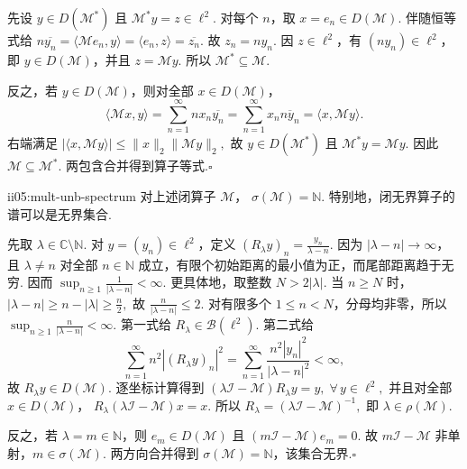 \begin{FAProof}
先设 \(\displaystyle y\in D(\mathcal M^*)\) 且 \(\displaystyle\mathcal M^*y=z\in\ell^2\). 对每个 \(\displaystyle n\)，取 \(\displaystyle x=e_n\in D(\mathcal M)\). 伴随恒等式给
\(\displaystyle n\overline{y_n} = \langle\mathcal Me_n,y\rangle = \langle e_n,z\rangle = \overline{z_n}.\)
故 \(\displaystyle z_n=ny_n\). 因 \(\displaystyle z\in\ell^2\)，有 \(\displaystyle(ny_n)\in\ell^2\)，即 \(\displaystyle y\in D(\mathcal M)\)，并且 \(\displaystyle z=\mathcal My\). 所以 \(\displaystyle\mathcal M^*\subseteq\mathcal M\).

反之，若 \(\displaystyle y\in D(\mathcal M)\)，则对全部 \(\displaystyle x\in D(\mathcal M)\)，
\[
\langle\mathcal Mx,y\rangle
=
\sum_{n=1}^{\infty}nx_n\overline{y_n}
=
\sum_{n=1}^{\infty}x_n\overline{ny_n}
=
\langle x,\mathcal My\rangle.
\]
右端满足
\(\displaystyle |\langle x,\mathcal My\rangle| \leqslant \|x\|_2\|\mathcal My\|_2,\)
故 \(\displaystyle y\in D(\mathcal M^*)\) 且 \(\displaystyle\mathcal M^*y=\mathcal My\). 因此 \(\displaystyle\mathcal M\subseteq\mathcal M^*\). 两包含合并得到算子等式.\hfill\(\square\)
\end{FAProof}

\begin{FAProposition}[B][直接预解与谱]{ii05:mult-unb-spectrum}
对上述闭算子 \(\displaystyle\mathcal M\)，
\(\displaystyle \sigma(\mathcal M)=\mathbb N.\)
特别地，闭无界算子的谱可以是无界集合.
\end{FAProposition}

\begin{FAProof}
先取 \(\displaystyle\lambda\in\mathbb C\setminus\mathbb N\). 对 \(\displaystyle y=(y_n)\in\ell^2\)，定义
\(\displaystyle (R_\lambda y)_n=\frac{y_n}{\lambda-n}.\)
因为 \(\displaystyle|\lambda-n|\to\infty\)，且 \(\displaystyle\lambda\neq n\) 对全部 \(\displaystyle n\in\mathbb N\) 成立，有限个初始距离的最小值为正，而尾部距离趋于无穷. 因而
\(\displaystyle \sup_{n\geqslant1}\frac1{|\lambda-n|}<\infty.\)
更具体地，取整数 \(\displaystyle N>2|\lambda|\). 当 \(\displaystyle n\geqslant N\) 时，
\(\displaystyle |\lambda-n|\geqslant n-|\lambda|\geqslant\frac n2,\)
故 \(\displaystyle \frac{n}{|\lambda-n|}\leqslant2\). 对有限多个 \(\displaystyle1\leqslant n<N\)，分母均非零，所以
\(\displaystyle \sup_{n\geqslant1}\frac n{|\lambda-n|}<\infty.\)
第一式给 \(\displaystyle R_\lambda\in\mathcal B(\ell^2)\). 第二式给
\[
\sum_{n=1}^{\infty}n^2|(R_\lambda y)_n|^2
=
\sum_{n=1}^{\infty}\frac{n^2|y_n|^2}{|\lambda-n|^2}
<\infty,
\]
故 \(\displaystyle R_\lambda y\in D(\mathcal M)\). 逐坐标计算得到
\(\displaystyle (\lambda\mathcal I-\mathcal M)R_\lambda y=y ,\;\forall\,y\in\ell^2,\)
并且对全部 \(\displaystyle x\in D(\mathcal M)\)，
\(\displaystyle R_\lambda(\lambda\mathcal I-\mathcal M)x=x.\)
所以
\(\displaystyle R_\lambda=(\lambda\mathcal I-\mathcal M)^{-1},\)
即 \(\displaystyle\lambda\in\rho(\mathcal M)\).

反之，若 \(\displaystyle\lambda=m\in\mathbb N\)，则 \(\displaystyle e_m\in D(\mathcal M)\) 且
\(\displaystyle (m\mathcal I-\mathcal M)e_m=0.\)
故 \(\displaystyle m\mathcal I-\mathcal M\) 非单射，\(\displaystyle m\in\sigma(\mathcal M)\). 两方向合并得到 \(\displaystyle\sigma(\mathcal M)=\mathbb N\)，该集合无界.\hfill\(\square\)
\end{FAProof}

